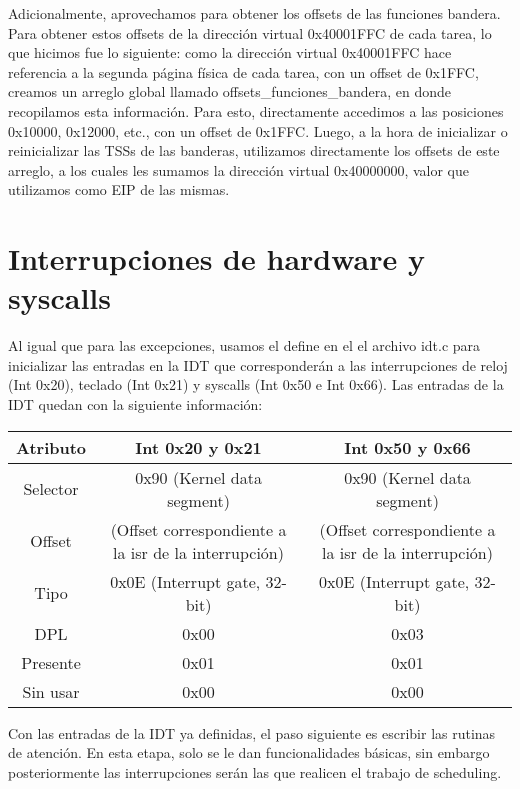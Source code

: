 \documentclass[10pt, a4paper]{article}
\begin{document}
Adicionalmente, aprovechamos para obtener los offsets de las funciones bandera. Para obtener estos offsets de la direcci\'on virtual 0x40001FFC de cada tarea, lo que hicimos fue lo siguiente: como la direcci\'on virtual
0x40001FFC hace referencia a la segunda p\'agina f\'isica de cada tarea, con un offset de 0x1FFC, creamos un arreglo global llamado offsets\_funciones\_bandera, 
en donde recopilamos esta informaci\'on. Para esto, directamente accedimos a las posiciones 0x10000, 0x12000, etc.,
con un offset de 0x1FFC. Luego, a la hora de inicializar o reinicializar las TSSs de las banderas, utilizamos directamente los offsets de este arreglo, a los cuales les sumamos la direcci\'on virtual 0x40000000, valor que 
utilizamos como EIP de las mismas.



\section{Interrupciones de hardware y syscalls}

Al igual que para las excepciones, usamos el define en el el archivo idt.c para inicializar las entradas en la IDT que corresponder\'an a las interrupciones
de reloj (Int 0x20), teclado (Int 0x21) y syscalls (Int 0x50 e Int 0x66). Las entradas de la IDT quedan con la siguiente informaci\'on:

\begin{center}
\begin{tabular}{| c || c | c |}

	\hline
		Atributo & Int 0x20 y 0x21 & Int 0x50 y 0x66\\
	\hline
		Selector & 0x90 (Kernel data segment) & 0x90 (Kernel data segment)\\
		Offset & (Offset correspondiente a la isr de la interrupci\'on) & (Offset correspondiente a la isr de la interrupci\'on)\\
		Tipo & 0x0E (Interrupt gate, 32-bit) & 0x0E (Interrupt gate, 32-bit)\\
		DPL & 0x00 & 0x03\\
		Presente & 0x01 & 0x01\\
		Sin usar & 0x00 & 0x00\\
	\hline
\end{tabular}
\end{center}

Con las entradas de la IDT ya definidas, el paso siguiente es escribir las rutinas de atenci\'on. En esta etapa, solo se le dan funcionalidades b\'asicas,
sin embargo posteriormente las interrupciones ser\'an las que realicen el trabajo de scheduling.
\end{document}
